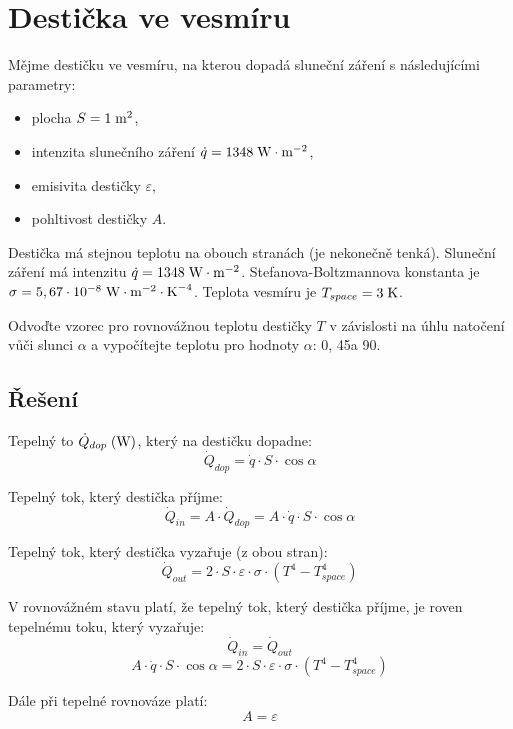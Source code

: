 \documentclass{article}
\begin{document}
\newpage




\section{ Destička ve vesmíru \spicy \spicy}
Mějme destičku ve vesmíru, na kterou dopadá sluneční záření s následujícími parametry:
\begin{itemize}
    \item plocha $S = 1 \; \textrm{m}^{\textrm{2}}$,
    \item intenzita slunečního záření $\dot{q} = 1348 \; \textrm{W} \cdot \textrm{m}^{-2}$,
    \item emisivita destičky $\varepsilon$,
    \item pohltivost destičky $A$.
\end{itemize}

Destička má stejnou teplotu na obouch stranách (je nekonečně tenká). Sluneční záření má intenzitu $\dot{q} = 1348 \; \textrm{W} \cdot \textrm{m}^{-2}$. Stefanova-Boltzmannova konstanta je $\sigma = 5,67 \cdot 10^{-8} \; \textrm{W} \cdot \textrm{m}^{-2} \cdot \textrm{K}^{-4}$. Teplota vesmíru je $T_{space} = 3 \; \textrm{K}$.

Odvoďte vzorec pro rovnovážnou teplotu destičky $T$ v závislosti na úhlu natočení vůči slunci $\alpha$ a vypočítejte teplotu pro hodnoty $\alpha$: 0\ueqDEGREE, 45\ueqDEGREE a 90\ueqDEGREE.



\subsection{Řešení}
Tepelný to $\dot{Q}_{dop} \; (\textrm{W})$, který na destičku dopadne:
$$
    \dot{Q}_{dop} = \dot{q} \cdot S \cdot \cos \alpha
$$

Tepelný tok, který destička příjme:
$$
    \dot{Q}_{in} = A \cdot \dot{Q}_{dop} = A \cdot \dot{q} \cdot S \cdot \cos \alpha
$$

Tepelný tok, který destička vyzařuje (z obou stran):
$$
    \dot{Q}_{out} = 2 \cdot S \cdot \varepsilon \cdot \sigma \cdot \left( T^4 - T_{space}^4 \right)
$$

V rovnovážném stavu platí, že tepelný tok, který destička příjme, je roven tepelnému toku, který vyzařuje:
$$
    \dot{Q}_{in} = \dot{Q}_{out}
$$
$$
    A \cdot \dot{q} \cdot S \cdot \cos \alpha = 2 \cdot S \cdot \varepsilon \cdot \sigma \cdot \left( T^4 - T_{space}^4 \right)
$$

Dále při tepelné rovnováze platí:
$$
    A = \varepsilon
$$
\end{document}
